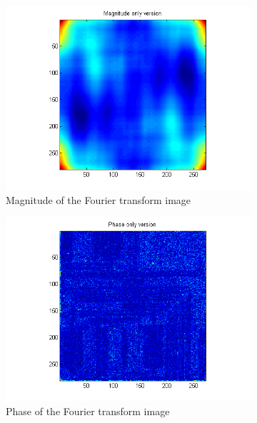 \documentclass[a4paper, 10pt, conference] {article}
\begin{document}
\begin{figure}[H]
 	\centering
 	\begin{subfigure}{0.32\textwidth} 
 		\centering						
 		\includegraphics[scale=0.5]{reportImages/exp1_magnitude.PNG}
		\caption{Magnitude of the Fourier transform image}
	\end{subfigure}
	\begin{subfigure}{0.32\textwidth}
		\centering
		\includegraphics[scale=0.5]{reportImages/exp1_phase.PNG}
		\caption{Phase of the Fourier transform image}
	\end{subfigure}
	\begin{subfigure}{0.32\textwidth}
		\centering

\end{subfigure}
\end{figure}
\end{document}
